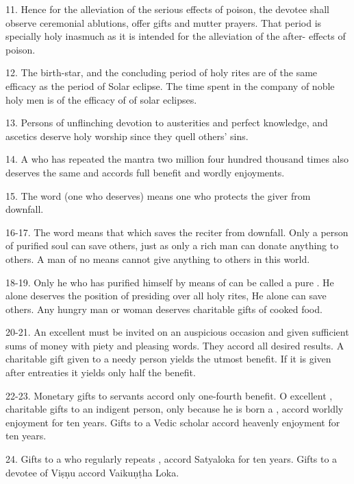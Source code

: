 11. Hence for the alleviation of the serious effects of poison, the devotee
shall observe ceremonial ablutions, offer gifts and mutter prayers. That period
is specially holy inasmuch as it is intended for the alleviation of the after-
effects of poison.

12. The birth-star, and the concluding period of holy rites are of the same
efficacy as the period of Solar eclipse. The time spent in the company of noble
holy men is of the efficacy of  of solar eclipses.

13. Persons of unflinching devotion to austerities and perfect knowledge,
 and ascetics deserve holy worship since they quell others’ sins.

14. A  who has repeated the  mantra two million four
hundred thousand times also deserves the same and accords full benefit and
wordly enjoyments.

15. The word  (one who deserves) means one who protects the giver
from downfall.

16-17. The word  means that which saves the reciter from downfall.
Only a person of purified soul can save others, just as only a rich man can
donate anything to others. A man of no means cannot give anything to others in
this world.

18-19. Only he who has purified himself by means of  can be
called a pure . He alone deserves the position of presiding over
all holy rites,  \etc He alone can save others. Any
hungry man or woman deserves charitable gifts of cooked food.

20-21. An excellent  must be invited on an auspicious occasion and
given sufficient sums of money with piety and pleasing words. They accord all
desired results. A charitable gift given to a needy person yields the utmost
benefit. If it is given after entreaties it yields only half the benefit.

22-23. Monetary gifts to servants accord only one-fourth benefit. O excellent
, charitable gifts to an indigent person, only because he is born
a , accord worldly enjoyment for ten years. Gifts to
a  Vedic scholar accord heavenly enjoyment for ten years.

24. Gifts to a  who regularly repeats , accord
Satyaloka for ten years. Gifts to a  devotee of Viṣṇu accord
Vaikuṇṭha Loka.

